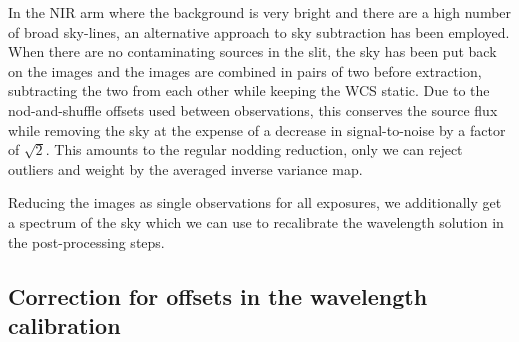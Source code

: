 \documentclass{aa}    %
\begin{document}
In the NIR arm where the background is very bright and there are a high number
of broad sky-lines, an alternative approach to sky subtraction has been
employed. When there are no contaminating sources in the slit, the sky has been
put back on the images and the images are combined in pairs of two before
extraction, subtracting the two from each other while keeping the WCS static.
Due to the nod-and-shuffle offsets used between observations, this conserves the
source flux while removing the sky at the expense of a decrease in
signal-to-noise by a factor of $\sqrt{2}$. This amounts to the regular nodding
reduction, only we can reject outliers and weight by the averaged inverse
variance map.

Reducing the images as single observations for all exposures, we additionally
get a spectrum of the sky which we can use to recalibrate the wavelength
solution in the post-processing steps.


\subsection{Correction for offsets in the wavelength calibration}    \label{wavecal}
\end{document}
